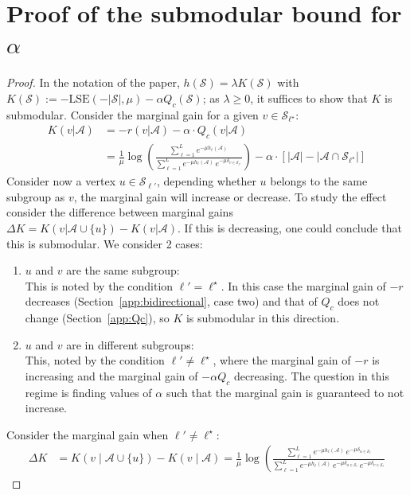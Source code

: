 \documentclass{article}
\def \setA{\mathcal{A}}
\def \setS{\mathcal{S}}
\def \LSE{\mathrm{LSE}}
\begin{document}
\section{Proof of the submodular bound for $\alpha$}
\label{App:Ksubforalpha}
\begin{proof}
In the notation of the paper, $h(\setS) = \lambda K(\setS)$ with $K(\setS) := -\LSE(-|\setS|,\mu) - \alpha Q_c(\setS)$; as $\lambda \geq 0$, it suffices to show that $K$ is submodular. Consider the marginal gain for a given $v \in \setS_{\ell^\star}$:
\begin{align}
	K(v|\setA) &= -r(v|\setA)-\alpha\cdot Q_c(v|\setA)\\
	&=  \frac{1}{\mu} \log\!\left(
	\frac{\sum_{\ell=1}^{L} e^{-\mu h_{\ell}(\setA)}}
	{\sum_{\ell=1}^{L} e^{-\mu h_{\ell}(\setA)} \, e^{-\mu \delta_{v \in \setS_{\ell^\star}}}}
	\right) - \alpha \cdot [|\setA|-|\setA \cap \setS_{\ell^\star}|]
\end{align}
Consider now a vertex $u \in \setS_{\ell'}$, depending whether $u$ belongs to the same subgroup as $v$, the marginal gain will increase or decrease. To study the effect consider the difference between marginal gains $\Delta K = K(v|\setA\cup \{u\})-K(v|\setA)$. If this is decreasing, one could conclude that this is submodular. We consider 2 cases:
\begin{enumerate}
	\item $u$ and $v$ are the same subgroup:\\ This is noted by the condition $\ell' = \ell^\star$. In this case the marginal gain of $-r$ decreases (Section~\ref{app:bidirectional}, case two) and that of $Q_c$ does not change (Section~\ref{app:Qc}), so $K$ is submodular in this direction.
	\item $u$ and $v$ are in different subgroups:\\
	This, noted by the condition  $\ell' \neq \ell^\star$, where  the marginal gain of $-r$ is increasing and the marginal gain of $-\alpha Q_c$ decreasing. The question in this regime is finding values of $\alpha$ such that the marginal gain is guaranteed to not increase.
\end{enumerate}
Consider the marginal gain when $\ell' \neq \ell^\star$:
\begin{align*}
	\Delta K &=K(v \mid \setA \cup \{u\}) - K(v \mid \setA)
	= \frac{1}{\mu}\log\!\left(
	\frac{\sum_{\ell=1}^{L} e^{-\mu h_\ell(\setA)} \, e^{-\mu \delta_{u \in \setS_{\ell}}}}
	{\sum_{\ell=1}^{L} e^{-\mu h_\ell(\setA)} \, e^{-\mu \delta_{u \in \setS_{\ell}}}\, e^{-\mu \delta_{v \in \setS_{\ell}}}}

\end{align*}
\end{proof}
\end{document}
